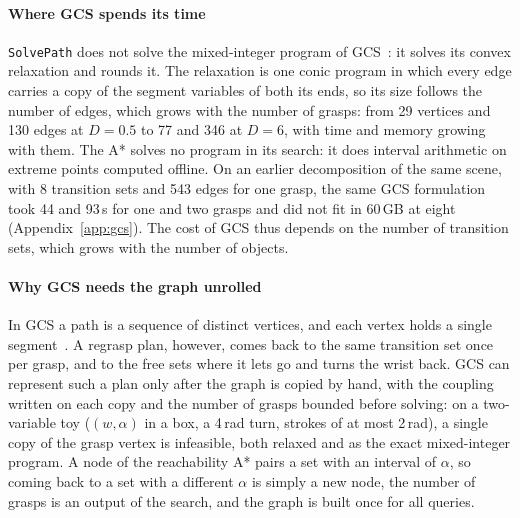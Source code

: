 \paragraph{Where GCS spends its time} \texttt{SolvePath} does not solve the
mixed-integer program of GCS~\cite{marcucci2024shortest}: it solves its convex
relaxation and rounds it. The relaxation is one conic program in which every
edge carries a copy of the segment variables of both its ends, so its size
follows the number of edges, which grows with the number of grasps: from
29 vertices and 130 edges at $D=0.5$ to 77 and 346 at $D=6$, with time and
memory growing with them. The A* solves no program in its search: it does
interval arithmetic on extreme points computed offline. On an earlier
decomposition of the same scene, with 8 transition sets and 543 edges for one
grasp, the same GCS formulation took 44 and 93\,s for one and two grasps and
did not fit in 60\,GB at eight (Appendix~\ref{app:gcs}). The cost of GCS thus
depends on the number of transition sets, which grows with the number of
objects.

\paragraph{Why GCS needs the graph unrolled} In GCS a path is a sequence of
distinct vertices, and each vertex holds a single
segment~\cite{marcucci2024shortest}. A regrasp plan, however, comes back to
the same transition set once per grasp, and to the free sets where it lets go
and turns the wrist back. GCS can represent such a plan only after the graph is
copied by hand, with the coupling written on each copy and the number of
grasps bounded before solving: on a two-variable toy ($(w,\alpha)$ in a box, a
4\,rad turn, strokes of at most 2\,rad), a single copy of the grasp vertex is
infeasible, both relaxed and as the exact mixed-integer program. A node of the
reachability A* pairs a set with an interval of $\alpha$, so coming back to a
set with a different $\alpha$ is simply a new node, the number of grasps is an
output of the search, and the graph is built once for all queries.

